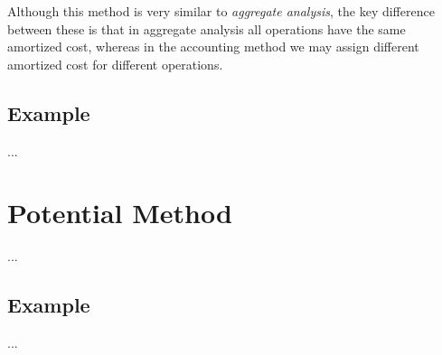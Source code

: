 Although this method is very similar to \textit{aggregate analysis}, the key
difference between these is that in aggregate analysis all operations have
the same amortized cost, whereas in the accounting method we may assign
different amortized cost for different operations.

\subsection{Example}
...

\section{Potential Method}
...

\subsection{Example}
...

